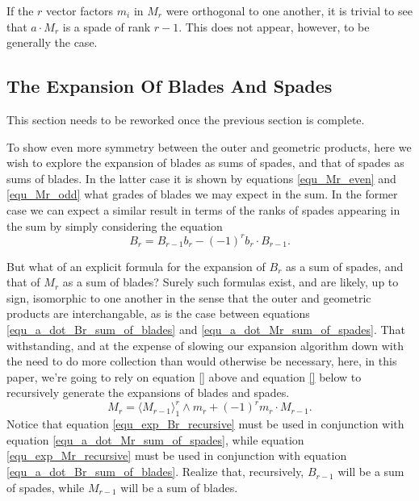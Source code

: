 \documentclass{birkjour}
\theoremstyle{definition}
\theoremstyle{remark}
\numberwithin{equation}{section}
\begin{document}
If the $r$ vector factors $m_i$ in $M_r$ were orthogonal to one another, it is trivial to see that $a\cdot M_r$ is a spade of rank $r-1$.
This does not appear, however, to be generally the case.


\subsection{The Expansion Of Blades And Spades}

This section needs to be reworked once the previous section is complete.

To show even more symmetry between the outer and geometric products, here we wish to explore the expansion of
blades as sums of spades, and that of spades as sums of blades.
In the latter case it is shown by equations \eqref{equ_Mr_even} and \eqref{equ_Mr_odd} what grades of blades we may expect in the sum.
In the former case we can expect a similar result in terms of the ranks of spades appearing in the sum by simply
considering the equation
\begin{equation}\label{equ_exp_Br_recursive}
B_r = B_{r-1}b_r - (-1)^rb_r\cdot B_{r-1}.
\end{equation}

But what of an explicit formula for the expansion of $B_r$ as a sum of spades, and that of $M_r$ as a sum of blades?
Surely such formulas exist, and are likely, up to sign, isomorphic to one another in the sense that the outer and geometric products
are interchangable, as is the case between equations \eqref{equ_a_dot_Br_sum_of_blades} and \eqref{equ_a_dot_Mr_sum_of_spades}.
That withstanding, and at the expense of slowing our expansion
algorithm down with the need to do more collection than would otherwise be necessary, here, in this paper, we're going to rely on equation \eqref{} above and
equation \eqref{} below to recursively generate the expansions of blades and spades.
\begin{equation}\label{equ_exp_Mr_recursive}
M_r = \langle M_{r-1}\rangle_1^r\wedge m_r + (-1)^rm_r \cdot M_{r-1}.
\end{equation}
Notice that equation \eqref{equ_exp_Br_recursive} must be used in conjunction with equation \eqref{equ_a_dot_Mr_sum_of_spades}, while
equation \eqref{equ_exp_Mr_recursive} must be used in conjunction with equation \eqref{equ_a_dot_Br_sum_of_blades}.  Realize that, recursively,
$B_{r-1}$ will be a sum of spades, while $M_{r-1}$ will be a sum of blades.
\end{document}
